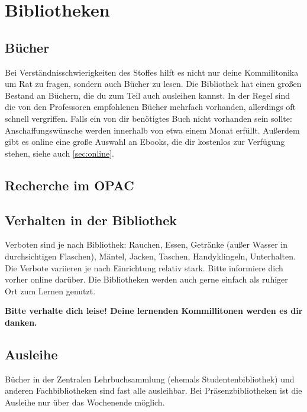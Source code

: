 \chapter{Bibliotheken}

\section{Bücher}

Bei Verständnisschwierigkeiten des Stoffes hilft es nicht nur deine Kommilitonika
um Rat zu fragen, sondern auch Bücher zu lesen. Die Bibliothek
hat einen großen Bestand an Büchern, die du zum Teil auch ausleihen kannst.
In der Regel sind die von den Professoren empfohlenen Bücher
mehrfach vorhanden, allerdings oft schnell vergriffen. Falls ein
von dir benötigtes Buch nicht vorhanden sein sollte:
Anschaffungswünsche werden innerhalb von etwa einem Monat erfüllt. Außerdem gibt es
online eine große Auswahl an Ebooks, die dir kostenlos zur Verfügung stehen, siehe
auch \ref{sec:online}.

\section{Recherche im OPAC}
	\begin{urlList}
	\end{urlList}

\section{Verhalten in der Bibliothek}
Verboten sind je nach Bibliothek: Rauchen, Essen, Getränke (außer Wasser in durchsichtigen Flaschen), Mäntel, Jacken, Taschen, Handyklingeln, Unterhalten.\\
Die Verbote variieren je nach Einrichtung relativ stark. Bitte informiere dich vorher online darüber.
Die Bibliotheken werden auch gerne einfach als ruhiger Ort zum Lernen genutzt.

\textbf{Bitte verhalte dich leise!
Deine lernenden Kommillitonen werden es dir danken.}

\section{Ausleihe}

Bücher in der Zentralen Lehrbuchsammlung (ehemals
Studentenbibliothek) und anderen Fachbibliotheken sind fast alle
ausleihbar. Bei Präsenzbibliotheken ist die Ausleihe nur über das
Wochenende möglich.

